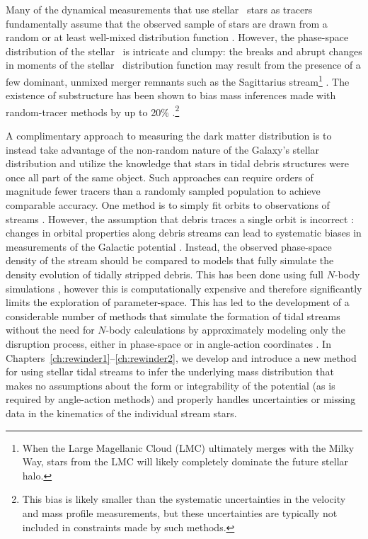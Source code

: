 Many of the dynamical measurements that use stellar \mwhalo\ stars as tracers fundamentally assume that the observed sample of stars are drawn from a random or at least well-mixed distribution function \citep[e.g.,][]{todo jeans}. However, the phase-space distribution of the stellar \mwhalo\ is intricate and clumpy: the breaks and abrupt changes in moments of the stellar \mwhalo\ distribution function may result from the presence of a few dominant, unmixed merger remnants such as the Sagittarius stream\footnote{When the Large Magellanic Cloud (LMC) ultimately merges with the Milky Way, stars from the LMC will likely completely dominate the future stellar halo.} \citep[which contains almost as much stellar mass as the rest of the stellar \mwhalo\ combined;][]{todo}. The existence of substructure has been shown to bias mass inferences made with random-tracer methods by up to 20\% \citep{yencho06}.\footnote{This bias is likely smaller than the systematic uncertainties in the velocity and mass profile measurements, but these uncertainties are typically not included in constraints made by such methods.} 

A complimentary approach to measuring the dark matter distribution is to instead take advantage of the non-random nature of the Galaxy's stellar distribution and utilize the knowledge that stars in tidal debris structures were once all part of the same object. Such approaches can require orders of magnitude fewer tracers than a randomly sampled population to achieve comparable accuracy. One method is to simply fit orbits to observations of streams \citep[e.g.,][]{koposov10}. However, the assumption that debris traces a single orbit is incorrect \citep[see][]{johnston98,helmi99}: changes in orbital properties along debris streams can lead to systematic biases in measurements of the Galactic potential \citep{eyre09a,varghese11}. Instead, the observed phase-space density of the stream should be compared to models that fully simulate the density evolution of tidally stripped debris. This has been done using full $N$-body simulations \citep{todo, law10}, however this is computationally expensive and therefore significantly limits the exploration of parameter-space. This has led to the development of a considerable number of methods that simulate the formation of tidal streams without the need for $N$-body calculations by approximately modeling only the disruption process, either in phase-space \citep{varghese11, kuepper12, todo} or in angle-action coordinates \citep{sanders,todo}. In Chapters~\ref{ch:rewinder1}--\ref{ch:rewinder2}, we develop and introduce a new method for using stellar tidal streams to infer the underlying mass distribution that makes no assumptions about the form or integrability of the potential (as is required by angle-action methods) and properly handles uncertainties or missing data in the kinematics of the individual stream stars.

